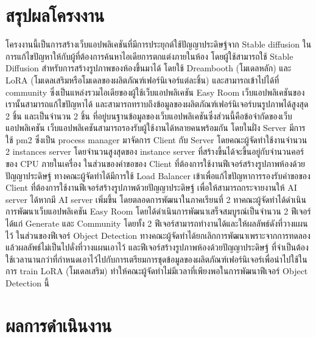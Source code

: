 \documentclass[12pt,oneside,openright,a4paper]{cpe-thai-project}
\begin{document}
\section{สรุปผลโครงงาน}
\hspace{18pt}โครงงานนี้เป็นการสร้างเว็บแอปพลิเคชันที่มีการประยุกต์ใช้ปัญญาประดิษฐ์จาก Stable diffusion ในการแก้ไขปัญหาให้กับผู้ที่ต้องการค้นหาไอเดียการตกแต่งภายในห้อง โดยผู้ใช้สามารถใช้ Stable Diffusion สำหรับการสร้างรูปภาพของห้องขึ้นมาได้ โดยใช้ Dreambooth (โมเดลหลัก) และ LoRA (โมเดลเสริมหรือโมเดลของผลิตภัณฑ์เฟอร์นิเจอร์แต่ละชิ้น) และสามารถเข้าไปได้ที่ community ซึ่งเป็นแหล่งรวมไอเดียของผู้ใช้เว็บแอปพลิเคชัน Easy Room  เว็บแอปพลิเคชันของเรานั้นสามารถแก้ไขปัญหาได้ และสามารถทราบถึงข้อมูลของผลิตภัณฑ์เฟอร์นิเจอร์บนรูปภาพได้สูงสุด 2 ชิ้น และเป็นจำนวน 2 ชิ้น ที่อยู่บนฐานข้อมูลของเว็บแอปพลิเคชันซึ่งส่วนนี้คือข้อจำกัดของเว็บแอปพลิเคชัน
เว็บแอปพลิเคชันสามารถรองรับผู้ใช้งานได้หลายคนพร้อมกัน โดยในฝั่ง Server มีการใช้ pm2 ซึ่งเป็น process manager มาจัดการ Client กับ Server โดยคณะผู้จัดทำใช้งานจำนวน 2 instances server โดยจำนวนสูงสุดของ instance server ที่สร้างขึ้นได้จะขึ้นอยู่กับจำนวนคอร์ของ CPU ภายในเครื่อง
ในส่วนของคำขอของ Client ที่ต้องการใช้งานฟีเจอร์สร้างรูปภาพห้องด้วยปัญญาประดิษฐ์ ทางคณะผู้จัดทำได้มีการใช้ Load Balancer เข้าเพื่อแก้ไขปัญหาการรองรับคำขอของ Client ที่ต้องการใช้งานฟีเจอร์สร้างรูปภาพด้วยปัญญาประดิษฐ์ เพื่อให้สามารถกระจายงานให้ AI server ได้หากมี AI server เพิ่มขึ้น
โดยตลอดการพัฒนาในภาคเรียนที่ 2 ทาคณะผู้จัดทำได้ดำเนินการพัฒนาเว็บแอปพลิเคชัน Easy Room โดยได้ดำเนินการพัฒนาเสร็จสมบูรณ์เป็นจำนวน 2 ฟีเจอร์ ได้แก่ Generate  และ Community โดยทั้ง 2 ฟีเจอร์สามารถทำงานได้และให้ผลลัพธ์ดังที่วางแผนไว้ ในส่วนของฟีเจอร์ Object Detection ทางคณะผู้จัดทำได้ยกเลิกการพัฒนาเพราะจากการทดลองแล้วผลลัพธ์ไม่เป็นไปดั่งที่วางแผนเอาไว้ และฟีเจอร์สร้างรูปภาพห้องด้วยปัญญาประดิษฐ์ ที่จำเป็นต้องใช้เวลานานกว่าที่กำหนดเอาไว้ไปกับการเตรียมการชุดข้อมูลของผลิตภัณฑ์เฟอร์นิเจอร์เพื่อนำไปใช้ในการ train LoRA (โมเดลเสริม) ทำให้คณะผู้จัดทำไม่มีเวลาที่เพียงพอในการพัฒนาฟีเจอร์ Object Detection นี้


\section{ผลการดําเนินงาน}
\end{document}
